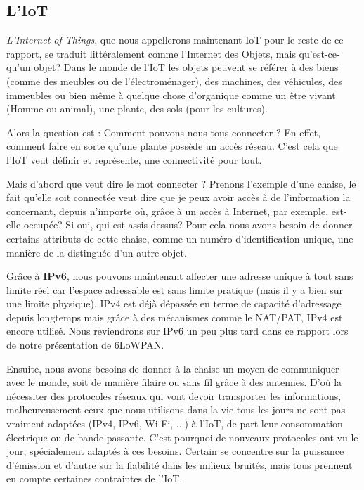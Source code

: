 
\subsection{L'IoT}

\textit{L'Internet of Things}, que nous appellerons maintenant IoT pour le reste de ce rapport, se traduit littéralement comme l'Internet des Objets, mais qu'est-ce-qu'un objet? Dans le monde de l'IoT les objets peuvent se référer à des biens (comme des meubles ou de l'électroménager), des machines, des véhicules, des immeubles ou bien même à quelque chose d'organique comme un être vivant (Homme ou animal), une plante, des sols (pour les cultures).

Alors la question est : Comment pouvons nous tous connecter ? En effet, comment faire en sorte qu'une plante possède un accès réseau. C'est cela que l'IoT veut définir et représente, une connectivité pour tout.

Mais d'abord que veut dire le mot connecter ? Prenons l'exemple d'une chaise, le fait qu'elle soit connectée veut dire que je peux avoir accès à de l'information la concernant, depuis n'importe où, grâce à un accès à Internet, par exemple, est-elle occupée? Si oui, qui est assis dessus? Pour cela nous avons besoin de donner certains attributs de cette chaise, comme un numéro d'identification unique, une manière de la distinguée d'un autre objet. 

Grâce à \textbf{IPv6}, nous pouvons maintenant affecter une adresse unique à tout sans limite réel car l'espace adressable est sans limite pratique (mais il y a bien sur une limite physique). IPv4 est déjà dépassée en terme de capacité d'adressage depuis longtemps mais grâce à des mécanismes comme le NAT/PAT, IPv4 est encore utilisé. Nous reviendrons sur IPv6 un peu plus tard dans ce rapport lors de notre présentation de 6LoWPAN.

Ensuite, nous avons besoins de donner à la chaise un moyen de communiquer avec le monde, soit de manière filaire ou sans fil grâce à des antennes. D'où la nécessiter des protocoles réseaux qui vont devoir transporter les informations, malheureusement ceux que nous utilisons dans la vie tous les jours ne sont pas vraiment adaptées (IPv4, IPv6, Wi-Fi, ...) à l'IoT, de part leur consommation électrique ou de bande-passante. C'est pourquoi de nouveaux protocoles ont vu le jour, spécialement adaptés à ces besoins. Certain se concentre sur la puissance d'émission et d'autre sur la fiabilité dans les milieux bruités, mais tous prennent en compte certaines contraintes de l'IoT.

